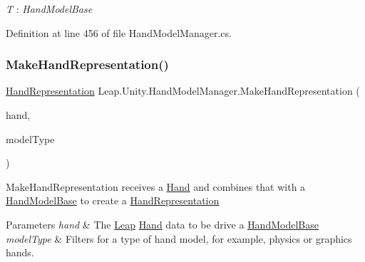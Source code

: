 \begin{Desc}
\item[Type Constraints]\begin{description}
\item[{\em T} : {\em Hand\+Model\+Base}]\end{description}
\end{Desc}


Definition at line 456 of file Hand\+Model\+Manager.\+cs.

\mbox{\label{class_leap_1_1_unity_1_1_hand_model_manager_a9f0b658a31543c0ec44cc354e0a0007b}} 
\subsubsection{\texorpdfstring{MakeHandRepresentation()}{MakeHandRepresentation()}}
{\footnotesize\ttfamily \mbox{\hyperlink{class_leap_1_1_unity_1_1_hand_representation}{Hand\+Representation}} Leap.\+Unity.\+Hand\+Model\+Manager.\+Make\+Hand\+Representation (\begin{DoxyParamCaption}\item[{\mbox{\hyperlink{class_leap_1_1_hand}{Hand}}}]{hand,  }\item[{\mbox{\hyperlink{namespace_leap_1_1_unity_a186e5eb0a2b743f1f6b79346f0ab8ad0}{Model\+Type}}}]{model\+Type }\end{DoxyParamCaption})}

Make\+Hand\+Representation receives a \mbox{\hyperlink{class_leap_1_1_hand}{Hand}} and combines that with a \mbox{\hyperlink{class_leap_1_1_unity_1_1_hand_model_base}{Hand\+Model\+Base}} to create a \mbox{\hyperlink{class_leap_1_1_unity_1_1_hand_representation}{Hand\+Representation}} 
\begin{DoxyParams}{Parameters}
{\em hand} & The \mbox{\hyperlink{namespace_leap_1_1_unity_1_1_leap}{Leap}} \mbox{\hyperlink{class_leap_1_1_hand}{Hand}} data to be drive a \mbox{\hyperlink{class_leap_1_1_unity_1_1_hand_model_base}{Hand\+Model\+Base}} \\
\hline
{\em model\+Type} & Filters for a type of hand model, for example, physics or graphics hands. \\
\hline
\end{DoxyParams}


